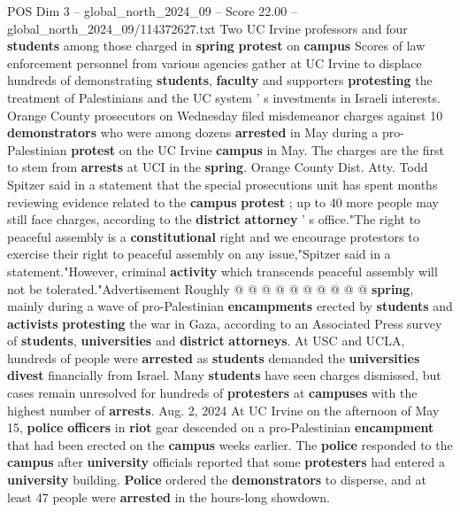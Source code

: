 \begin{textsample}{POS Dim 3 – global\_north\_2024\_09 – Score 22.00 – global\_north\_2024\_09/114372627.txt}  \label{ex:f3_pos_159}
Two UC Irvine professors and four \textbf{students} among those charged in \textbf{spring} \textbf{protest} on \textbf{campus} Scores of law enforcement personnel from various agencies gather at UC Irvine to displace hundreds of demonstrating \textbf{students}, \textbf{faculty} and supporters \textbf{protesting} the treatment of Palestinians and the UC system ' s investments in Israeli interests.
Orange County prosecutors on Wednesday filed misdemeanor charges against 10 \textbf{demonstrators} who were among dozens \textbf{arrested} in May during a pro-Palestinian \textbf{protest} on the UC Irvine \textbf{campus} in May.
The charges are the first to stem from \textbf{arrests} at UCI in the \textbf{spring}.
Orange County Dist.
Atty.
Todd Spitzer said in a statement that the special prosecutions unit has spent months reviewing evidence related to the \textbf{campus} \textbf{protest} ; up to 40 more people may still face charges, according to the \textbf{district} \textbf{attorney} ' s office."The right to peaceful assembly is a \textbf{constitutional} right and we encourage protestors to exercise their right to peaceful assembly on any issue,"Spitzer said in a statement."However, criminal \textbf{activity} which transcends peaceful assembly will not be tolerated."Advertisement Roughly @ @ @ @ @ @ @ @ @ @ \textbf{spring}, mainly during a wave of pro-Palestinian \textbf{encampments} erected by \textbf{students} and \textbf{activists} \textbf{protesting} the war in Gaza, according to an Associated Press survey of \textbf{students}, \textbf{universities} and \textbf{district} \textbf{attorneys}.
At USC and UCLA, hundreds of people were \textbf{arrested} as \textbf{students} demanded the \textbf{universities} \textbf{divest} financially from Israel.
Many \textbf{students} have seen charges dismissed, but cases remain unresolved for hundreds of \textbf{protesters} at \textbf{campuses} with the highest number of \textbf{arrests}.
Aug. 2, 2024 At UC Irvine on the afternoon of May 15, \textbf{police} \textbf{officers} in \textbf{riot} gear descended on a pro-Palestinian \textbf{encampment} that had been erected on the \textbf{campus} weeks earlier.
The \textbf{police} responded to the \textbf{campus} after \textbf{university} officials reported that some \textbf{protesters} had entered a \textbf{university} building. \textbf{Police} ordered the \textbf{demonstrators} to disperse, and at least 47 people were \textbf{arrested} in the hours-long showdown.

\end{textsample}
